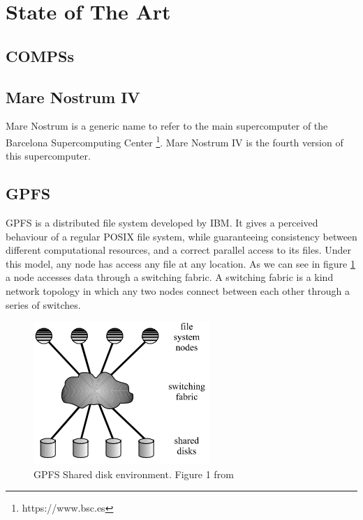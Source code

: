 \section{State of The Art}
\label{sec:state_of_the_art}

\subsection{COMPSs}
\label{subsec:compss_state_of_the_art}


\subsection{Mare Nostrum IV}
\label{subsec:mare_nostrum}
Mare Nostrum is a generic name to refer to the main supercomputer of the Barcelona Supercomputing Center \footnote{https://www.bsc.es}. Mare Nostrum IV is the fourth version of this supercomputer.

\subsection{GPFS}
\label{subsec:gpfs}
GPFS \cite{schmuck2002gpfs} is a distributed file system developed by IBM. It gives a perceived behaviour of a regular POSIX file system, while guaranteeing consistency between different computational resources, and a correct parallel access to its files. Under this model, any node has access any file at any location. As we can see in figure \ref{fig:gpfs_schema} a node accesses data through a switching fabric. A switching fabric is a kind network topology in which any two nodes connect between each other through a series of switches.\\

\begin{figure}
\centering
\includegraphics{figures/gpfs_schema.png}
\caption{GPFS Shared disk environment. Figure 1 from \cite{ref:schmuck2002gpfs}}
\label{fig:gpfs_schema}
\end{figure}

